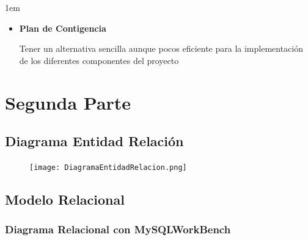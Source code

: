 \documentclass[12pt, fleqn]{report}                             %
\newenvironment{SmallIndentation}[1][0.75em]                    %
    {\begin{adjustwidth}{#1}{}\begin{footnotesize}}                 %
    {\end{footnotesize}\end{adjustwidth}}                           %
\begin{document}
\begin{SmallIndentation}[1em]
\begin{itemize}
                        \item
                            \textbf{Plan de Contigencia}

                                Tener un alternativa sencilla aunque pocos 
                                eficiente para la implementación de los 
                                diferentes componentes del proyecto

                    \end{itemize}
                
                \end{SmallIndentation}
                    



\chapter{Segunda Parte}
\clearpage

    \clearpage
    \section{Diagrama Entidad Relación}
        \begin{figure}[h]
            \centering
            \texttt{[image: DiagramaEntidadRelacion.png]}
        \end{figure}

        

    \clearpage
    \section{Modelo Relacional}

        \subsection{Diagrama Relacional con MySQLWorkBench}
\end{document}
